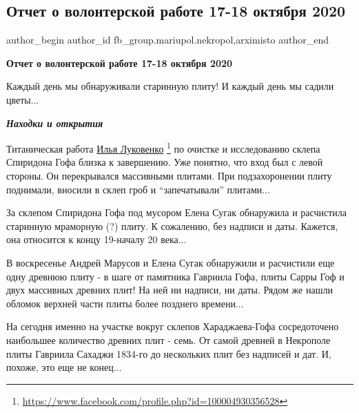 
 
 
 
 

\subsection{Отчет о волонтерской работе 17-18 октября 2020}
\label{sec:19_10_2020.fb.fb_group.mariupol.nekropol.1.otchet_volonter_rabota_17_18_oktjabrja_2020}
 
\ifcmt
 author_begin
   author_id fb_group.mariupol.nekropol,arximisto
 author_end
\fi

\bigskip
\textbf{Отчет о волонтерской работе 17-18 октября 2020}
\bigskip

Каждый день мы обнаруживали старинную плиту! И каждый день мы садили цветы...

\emph{\textbf{Находки и открытия}}

Титаническая работа \href{https://www.facebook.com/profile.php?id=100004930356528}{Илья Луковенко}%
\footnote{\url{https://www.facebook.com/profile.php?id=100004930356528}}
по очистке и исследованию склепа Спиридона Гофа близка к завершению. Уже
понятно, что вход был с левой стороны. Он перекрывался массивными плитами. При
подзахоронении плиту поднимали, вносили в склеп гроб и \enquote{запечатывали}
плитами...

За склепом Спиридона Гофа под мусором Елена Сугак обнаружила и расчистила
старинную мраморную (?) плиту. К сожалению, без надписи и даты. Кажется, она
относится к концу 19-началу 20 века...

В воскресенье Андрей Марусов и Елена Сугак обнаружили и расчистили еще одну
древнюю плиту - в шаге от памятника Гавриила Гофа, плиты Сарры Гоф и двух
массивных древних плит! На ней ни надписи, ни даты. Рядом же нашли обломок
верхней части плиты более позднего времени...

На сегодня именно на участке вокруг склепов Хараджаева-Гофа сосредоточено
наибольшее количество древних плит - семь. От самой древней в Некрополе плиты
Гавриила Сахаджи 1834-го до нескольких плит без надписей и дат. И, похоже, это
еще не конец...🙂

